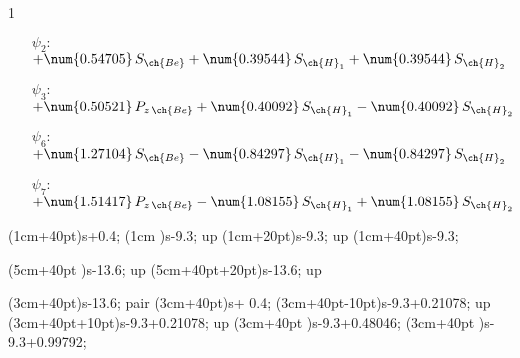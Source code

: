 \begin{questionBox}1{}
    
    \begin{itemize}
        \item[\(\psi_2:\)]
            \(
            +   \num{0.54705}\,S_{\ch{Be}}
            +   \num{0.39544}\,S_{\ch{H}_1}
            +   \num{0.39544}\,S_{\ch{H}_2}
            \)
        \item[\(\psi_3:\)]
            \(
            +   \num{0.50521}\,P_{z\,\ch{Be}}
            +   \num{0.40092}\,S_{\ch{H}_1}
            -   \num{0.40092}\,S_{\ch{H}_2}
            \)
        \item[\(\psi_6:\)]
            \(
            +   \num{1.27104}\,S_{\ch{Be}}
            -   \num{0.84297}\,S_{\ch{H}_1}
            -   \num{0.84297}\,S_{\ch{H}_2}
            \)
        \item[\(\psi_7:\)]
            \(
            +   \num{1.51417}\,P_{z\,\ch{Be}}
            -   \num{1.08155}\,S_{\ch{H}_1}
            +   \num{1.08155}\,S_{\ch{H}_2}
            \)
    \end{itemize}



    \begin{center}
        \begin{modiagram}
            \setlength\AtomVScale{0.4cm}

            \AO(1cm+40pt){s}{+0.4\AtomVScale;   } %
            \AO(1cm     ){s}{-9.3\AtomVScale; up} %
            \AO(1cm+20pt){s}{-9.3\AtomVScale; up} %
            \AO(1cm+40pt){s}{-9.3\AtomVScale;   } %

            \AO(5cm+40pt     ){s}{-13.6\AtomVScale; up} %
            \AO(5cm+40pt+20pt){s}{-13.6\AtomVScale; up} %

            \AO(3cm+40pt){s}{-13.6\AtomVScale; pair}   %
            \AO(3cm+40pt){s}{+ 0.4\AtomVScale;     }   %
            \AO(3cm+40pt-10pt){s}{-9.3\AtomVScale+0.21078\AtomVScale; up}   %
            \AO(3cm+40pt+10pt){s}{-9.3\AtomVScale+0.21078\AtomVScale; up}   %
            \AO(3cm+40pt     ){s}{-9.3\AtomVScale+0.48046\AtomVScale;   }   %
            \AO(3cm+40pt     ){s}{-9.3\AtomVScale+0.99792\AtomVScale;   }   %


\end{modiagram}
\end{center}
\end{questionBox}
